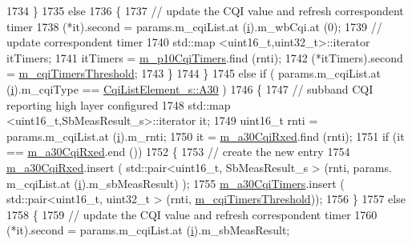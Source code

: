 \begin{DoxyCode}
1734             \}
1735           \textcolor{keywordflow}{else}
1736             \{
1737               \textcolor{comment}{// update the CQI value and refresh correspondent timer}
1738               (*it).second = params.m\_cqiList.at (\hyperlink{bernuolliDistribution_8m_a6f6ccfcf58b31cb6412107d9d5281426}{i}).m\_wbCqi.at (0);
1739               \textcolor{comment}{// update correspondent timer}
1740               std::map <uint16\_t,uint32\_t>::iterator itTimers;
1741               itTimers = \hyperlink{classns3_1_1PssFfMacScheduler_a687c4283769d0e08724b80d4f5a5cf77}{m\_p10CqiTimers}.find (rnti);
1742               (*itTimers).second = \hyperlink{classns3_1_1PssFfMacScheduler_a56d836fa470b6d79eca2b03258325373}{m\_cqiTimersThreshold};
1743             \}
1744         \}
1745       \textcolor{keywordflow}{else} \textcolor{keywordflow}{if} ( params.m\_cqiList.at (\hyperlink{bernuolliDistribution_8m_a6f6ccfcf58b31cb6412107d9d5281426}{i}).m\_cqiType == \hyperlink{structns3_1_1CqiListElement__s_a8f1bd827fd9842e7c07e39265d88299aab9a9d64494e36c89d7932a00edb056a7}{CqiListElement\_s::A30} )
1746         \{
1747           \textcolor{comment}{// subband CQI reporting high layer configured}
1748           std::map <uint16\_t,SbMeasResult\_s>::iterator it;
1749           uint16\_t rnti = params.m\_cqiList.at (\hyperlink{bernuolliDistribution_8m_a6f6ccfcf58b31cb6412107d9d5281426}{i}).m\_rnti;
1750           it = \hyperlink{classns3_1_1PssFfMacScheduler_ab1bc511b7c55ead9b2e8ff1e0d4b0e3b}{m\_a30CqiRxed}.find (rnti);
1751           \textcolor{keywordflow}{if} (it == \hyperlink{classns3_1_1PssFfMacScheduler_ab1bc511b7c55ead9b2e8ff1e0d4b0e3b}{m\_a30CqiRxed}.end ())
1752             \{
1753               \textcolor{comment}{// create the new entry}
1754               \hyperlink{classns3_1_1PssFfMacScheduler_ab1bc511b7c55ead9b2e8ff1e0d4b0e3b}{m\_a30CqiRxed}.insert ( std::pair<uint16\_t, SbMeasResult\_s > (rnti, params.
      m\_cqiList.at (\hyperlink{bernuolliDistribution_8m_a6f6ccfcf58b31cb6412107d9d5281426}{i}).m\_sbMeasResult) );
1755               \hyperlink{classns3_1_1PssFfMacScheduler_aebfb8f26fbeb4ab75f566ce974f2cb65}{m\_a30CqiTimers}.insert ( std::pair<uint16\_t, uint32\_t > (rnti, 
      \hyperlink{classns3_1_1PssFfMacScheduler_a56d836fa470b6d79eca2b03258325373}{m\_cqiTimersThreshold}));
1756             \}
1757           \textcolor{keywordflow}{else}
1758             \{
1759               \textcolor{comment}{// update the CQI value and refresh correspondent timer}
1760               (*it).second = params.m\_cqiList.at (\hyperlink{bernuolliDistribution_8m_a6f6ccfcf58b31cb6412107d9d5281426}{i}).m\_sbMeasResult;

\end{DoxyCode}
